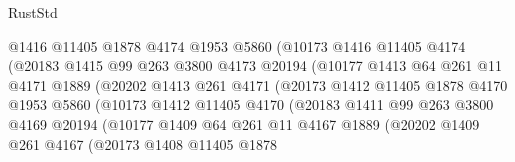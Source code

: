 \begin{lexlean}{RustStd}
\begin{coremodule}
                            @1416
                            @11405
                            @1878
                            @4174
                            @1953
                            @5860
                            (@10173
                              @1416
                              @11405
                              @4174
                              (@20183
                                @1415
                                @99
                                @263
                                @3800
                                @4173
                                @20194
                                (@10177
                                  @1413
                                  @64
                                  @261
                                  @11
                                  @4171
                                  @1889
                                  (@20202
                                    @1413
                                    @261
                                    @4171
                                    (@20173
                                      @1412
                                      @11405
                                      @1878
                                      @4170
                                      @1953
                                      @5860
                                      (@10173
                                        @1412
                                        @11405
                                        @4170
                                        (@20183
                                          @1411
                                          @99
                                          @263
                                          @3800
                                          @4169
                                          @20194
                                          (@10177
                                            @1409
                                            @64
                                            @261
                                            @11
                                            @4167
                                            @1889
                                            (@20202
                                              @1409
                                              @261
                                              @4167
                                              (@20173
                                                @1408
                                                @11405
                                                @1878

\end{coremodule}
\end{lexlean}
